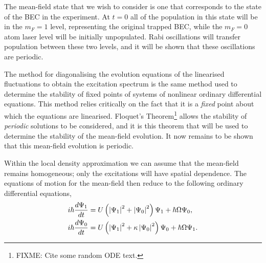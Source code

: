 The mean-field state that we wish to consider is one that corresponds to the state of the BEC in the experiment. At $t=0$ all of the population in this state will be in the $m_F=1$ level, representing the original trapped BEC, while the $m_F=0$ atom laser level will be initially unpopulated. Rabi oscillations will transfer population between these two levels, and it will be shown that these oscillations are periodic.

The method for diagonalising the evolution equations of the linearised fluctuations to obtain the excitation spectrum is the same method used to determine the stability of fixed points of systems of nonlinear ordinary differential equations. This method relies critically on the fact that it is a \emph{fixed} point about which the equations are linearised. Floquet's Theorem\footnote{FIXME: Cite some random ODE text.} allows the stability of \emph{periodic} solutions to be considered, and it is this theorem that will be used to determine the stability of the mean-field evolution. It now remains to be shown that this mean-field evolution is periodic.

Within the local density approximation we can assume that the mean-field remains homogeneous; only the excitations will have spatial dependence. The equations of motion for the mean-field then reduce to the following ordinary differential equations,
\begin{subequations}
    \label{Peaks:MeanFieldEquationsOfMotion}
    \begin{align}
    i \hbar \frac{d \Psi_1}{dt} &= U\left(\abs{\Psi_1}^2 + \abs{\Psi_0}^2\right)\Psi_1 + \hbar \Omega \Psi_0,\\
    i \hbar \frac{d \Psi_0}{dt} &= U\left(\abs{\Psi_1}^2 + \kappa \abs{\Psi_0}^2\right)\Psi_0 + \hbar \Omega \Psi_1.
    \end{align}
\end{subequations}

